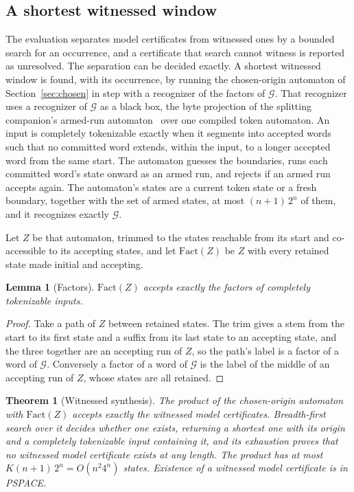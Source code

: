\documentclass[11pt,a4paper]{article}
\theoremstyle{definition}
\theoremstyle{plain}
\newtheorem{lemma}{Lemma}
\newtheorem{theorem}{Theorem}
\begin{document}
\subsection{A shortest witnessed window}
\label{sec:witnessed}

The evaluation separates model certificates from witnessed ones by a bounded search for an occurrence, and a certificate
that search cannot witness is reported as unresolved. The separation can be decided exactly. A shortest witnessed window
is found, with its occurrence, by running the chosen-origin automaton of Section~\ref{sec:chosen} in step with a
recognizer of the factors of $\mathcal{G}$. That recognizer uses a recognizer of $\mathcal{G}$ as a black box, the byte
projection of the splitting companion's armed-run automaton~\cite{nidhogg2026splitting} over one compiled token
automaton. An input is completely tokenizable exactly when it segments into accepted words such that no committed word
extends, within the input, to a longer accepted word from the same start. The automaton guesses the boundaries, runs
each committed word's state onward as an armed run, and rejects if an armed run accepts again. The automaton's states
are a current token state or a fresh boundary, together with the set of armed states, at most $(n + 1)\, 2^n$ of them,
and it recognizes exactly $\mathcal{G}$.

Let $Z$ be that automaton, trimmed to the states reachable from its start and co-accessible to its accepting states, and
let $\mathrm{Fact}(Z)$ be $Z$ with every retained state made initial and accepting.

\begin{lemma}[Factors]
\label{lem:factors}
$\mathrm{Fact}(Z)$ accepts exactly the factors of completely tokenizable inputs.
\end{lemma}

\begin{proof}
Take a path of $Z$ between retained states. The trim gives a stem from the start to its first state and a suffix from
its last state to an accepting state, and the three together are an accepting run of $Z$, so the path's label is a
factor of a word of $\mathcal{G}$. Conversely a factor of a word of $\mathcal{G}$ is the label of the middle of an
accepting run of $Z$, whose states are all retained.
\end{proof}

\begin{theorem}[Witnessed synthesis]
\label{thm:witnessed}
The product of the chosen-origin automaton with $\mathrm{Fact}(Z)$ accepts exactly the witnessed model certificates.
Breadth-first search over it decides whether one exists, returning a shortest one with its origin and a completely
tokenizable input containing it, and its exhaustion proves that no witnessed model certificate exists at any length. The
product has at most $K (n + 1)\, 2^n = O(n^2 4^n)$ states. Existence of a witnessed model certificate is in PSPACE.
\end{theorem}
\end{document}
